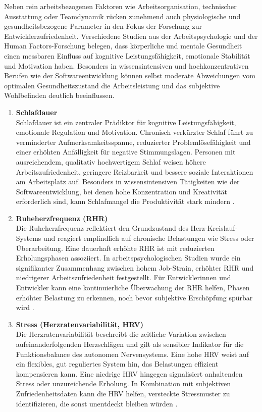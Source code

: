 \documentclass[12pt,a4paper]{report}
\begin{document}
Neben rein arbeitsbezogenen Faktoren wie Arbeitsorganisation, technischer Ausstattung oder Teamdynamik rücken zunehmend auch
physiologische und gesundheitsbezogene Parameter in den Fokus der Forschung zur Entwicklerzufriedenheit. Verschiedene Studien aus
der Arbeitspsychologie und der Human Factors-Forschung belegen, dass körperliche und mentale Gesundheit einen messbaren Einfluss
auf kognitive Leistungsfähigkeit, emotionale Stabilität und Motivation haben. Besonders in wissensintensiven und
hochkonzentrativen Berufen wie der Softwareentwicklung können selbst moderate Abweichungen vom optimalen Gesundheitszustand die
Arbeitsleistung und das subjektive Wohlbefinden deutlich beeinflussen.

\begin{enumerate}
  \item \textbf{Schlafdauer}\\
        Schlafdauer ist ein zentraler Prädiktor für kognitive Leistungsfähigkeit, emotionale Regulation und Motivation. Chronisch 
        verkürzter Schlaf führt zu verminderter Aufmerksamkeitsspanne, reduzierter Problemlösefähigkeit und einer erhöhten 
        Anfälligkeit für negative Stimmungslagen. Personen mit ausreichendem, qualitativ hochwertigem Schlaf weisen höhere
        Arbeitszufriedenheit, geringere Reizbarkeit und bessere soziale Interaktionen am Arbeitsplatz auf. Besonders in
        wissensintensiven Tätigkeiten wie der Softwareentwicklung, bei denen hohe Konzentration und Kreativität erforderlich sind,
        kann Schlafmangel die Produktivität stark mindern \cite{opoku_sleep_2023}.

  \item \textbf{Ruheherzfrequenz (RHR)}\\
        Die Ruheherzfrequenz reflektiert den Grundzustand des Herz-Kreislauf-Systems und reagiert empfindlich auf chronische 
        Belastungen wie Stress oder Überarbeitung. Eine dauerhaft erhöhte RHR ist mit  reduzierten Erholungsphasen assoziiert.
        In arbeitspsychologischen Studien wurde ein signifikanter Zusammenhang zwischen hohem Job-Strain, erhöhter RHR
        und niedrigerer Arbeitszufriedenheit festgestellt. Für Entwicklerinnen und Entwickler kann eine kontinuierliche Überwachung der RHR
        helfen, Phasen erhöhter Belastung zu erkennen, noch bevor subjektive Erschöpfung spürbar wird \cite{eriksson_rhr_2016}.

  \item \textbf{Stress (Herzratenvariabilität, HRV)}\\
        Die Herzratenvariabilität beschreibt die zeitliche Variation zwischen aufeinanderfolgenden Herzschlägen und gilt als
        sensibler Indikator für die Funktionsbalance des autonomen Nervensystems. Eine hohe HRV weist auf ein flexibles, gut
        reguliertes System hin, das Belastungen effizient kompensieren kann. Eine niedrige HRV hingegen signalisiert anhaltenden
        Stress oder unzureichende Erholung. In Kombination mit subjektiven Zufriedenheitsdaten kann die HRV helfen, versteckte
        Stressmuster zu identifizieren, die sonst unentdeckt bleiben würden \cite{borchini_hrv_2012}.


\end{enumerate}
\end{document}
